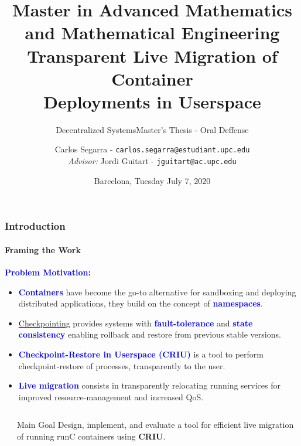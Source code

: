 \documentclass[9pt,    %
    english,            %
    xcolor=table,       %
    envcountsect,        %
    aspectratio=169     %
]{beamer}
\subtitle{Decentralized Systems} %
\title[Live Migration of Containers] %
    {\normalsize Master in Advanced Mathematics and Mathematical Engineering \\[5pt] \Large Transparent Live Migration of Container \\ \Large Deployments in Userspace}
\subtitle{Master's Thesis - Oral Deffense} %
\date[July 7, 2020] %
    {Barcelona, Tuesday July 7, 2020}
\author[] %
{Carlos Segarra - \texttt{carlos.segarra@estudiant.upc.edu} \\ \textit{Advisor:} Jordi Guitart - \texttt{jguitart@ac.upc.edu}}
\begin{document}

\begin{frame}
  \titlepage
\end{frame}

\begin{frame}
    \frametitle{Introduction}
    \framesubtitle{Framing the Work}

    \textbf{\textcolor{blue}{Problem Motivation:}}
    \begin{itemize}
        \item \textbf{\textcolor{blue}{Containers}} have become the go-to alternative for sandboxing and deploying distributed applications, they build on the concept of \textbf{\textcolor{blue}{namespaces}}.
        \item \href{https://en.wikipedia.org/wiki/Application_checkpointing}{Checkpointing} provides systems with \textbf{\textcolor{blue}{fault-tolerance}} and \textbf{\textcolor{blue}{state consistency}} enabling rollback and restore from previous stable versions.
        \item \textbf{\textcolor{blue}{Checkpoint-Restore in Userspace (CRIU)}} is a tool to perform checkpoint-restore of processes, transparently to the user.
        \item \textbf{\textcolor{blue}{Live migration}} consists in transparently relocating running services for improved resource-management and increased QoS.
    \end{itemize}

    \begin{columns}
        \begin{column}{.1\textwidth}
        \end{column}\hspace{-5cm}
        \begin{column}{.7\textwidth}
            \begin{alertblock}{Main Goal}
                Design, implement, and evaluate a tool for efficient live migration of running runC containers using \textbf{CRIU}.
            \end{alertblock}\hfill
        \end{column}
    \end{columns}

\end{frame}
\end{document}
